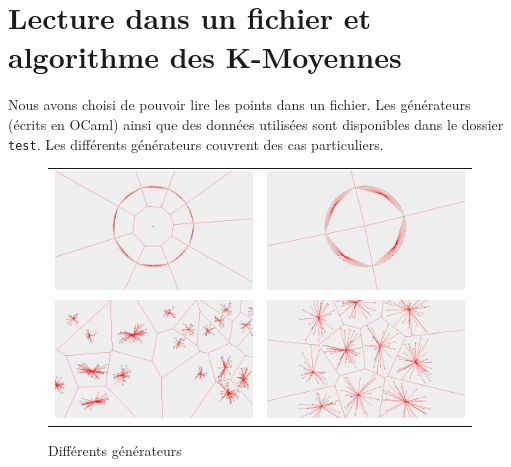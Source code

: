 \documentclass[a4paper]{article}
\begin{document}
  \section{Lecture dans un fichier et algorithme des K-Moyennes}

  Nous avons choisi de pouvoir lire les points dans un fichier. Les générateurs (écrits en OCaml) ainsi que des données utilisées sont disponibles dans le dossier \verb|test|. Les différents générateurs couvrent des cas particuliers.

  \newpage

  \begin{figure}[!h]
    \centering
    \begin{tabular}{cc}
      \includegraphics[width=8cm]{wheel.png} &
      \includegraphics[width=8cm]{circle.png} \\
      \includegraphics[width=8cm]{cluster.png} &
      \includegraphics[width=8cm]{uniform.png} \\
    \end{tabular}
    \caption{Différents générateurs}
  \end{figure}
\end{document}
